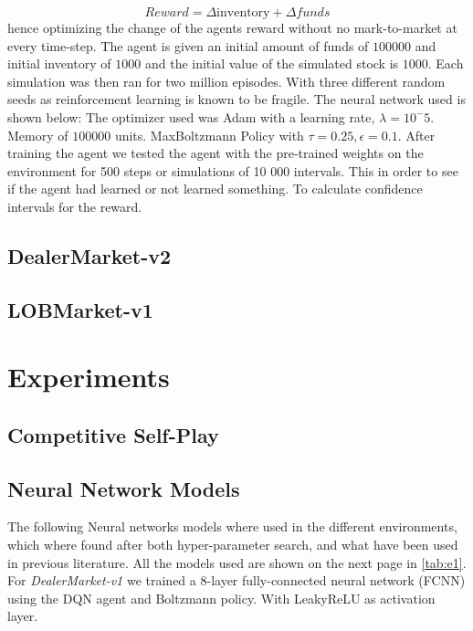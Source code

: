 \documentclass{kththesis}
\theoremstyle{definition}
\begin{document}
\begin{equation}
    \label{eq:m7}
    Reward = \Delta \text{inventory} + \Delta funds
\end{equation}
hence optimizing the change of the agents reward without no mark-to-market at every time-step. The agent is given an initial amount of funds of $100000$ and initial inventory of $1000$ and the initial value of the simulated stock is $1000$. Each simulation was then ran for two million episodes. With three different random seeds as reinforcement learning is known to be fragile. The neural network used is shown below:
\newline
\newline
The optimizer used was Adam with a learning rate, $\lambda =10^-{5}$. Memory of $100000$ units. MaxBoltzmann Policy with $\tau=0.25, \epsilon=0.1$. After training the agent we tested the agent with the pre-trained weights on the environment for 500 steps or simulations of 10 000 intervals. This in order to see if the agent had learned or not learned something. To calculate confidence intervals for the reward.
\subsection{DealerMarket-v2}

\subsection{LOBMarket-v1}

\section{Experiments}

\subsection{Competitive Self-Play}

\subsection{Neural Network Models}
The following Neural networks models where used in the different environments, which where found after both hyper-parameter search, and what have been used in previous literature. All the models used are shown on the next page in \autoref{tab:e1}. For \textit{DealerMarket-v1} we trained a 8-layer fully-connected neural network (FCNN) using the DQN agent and Boltzmann policy. With LeakyReLU as activation layer.
\end{document}
